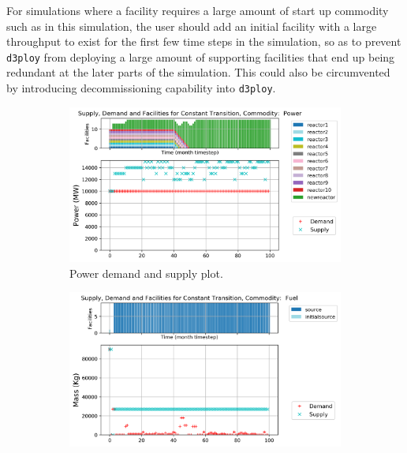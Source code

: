 \documentclass[11pt,letterpaper]{article}
\newcommand{\deploy}{\texttt{d3ploy}\xspace}%
\begin{document}
For simulations where a facility requires a large amount of start up
commodity such as in this simulation, the user should add an initial
facility with a large throughput to exist for the first few time steps
in the simulation, so as to prevent \deploy from deploying a large amount
of supporting facilities that end up being redundant at the later parts of 
the simulation.
This could also be circumvented by introducing decommissioning 
capability into \deploy.  

\begin{figure}[!htbp]
    \centering
    \begin{subfigure}[t]{\textwidth}
    \centering
        \includegraphics[width=\linewidth]{figures/constanttransition-power.png} 
        \caption{Power demand and supply plot.}
        \label{fig:constanttransition-power}
    \end{subfigure}
    \vspace{1cm}
    \begin{subfigure}[t]{0.45\textwidth}
        \centering
        \includegraphics[width=\linewidth]{figures/constanttransition-fuel.png} 

\end{subfigure}
\end{figure}
\end{document}
